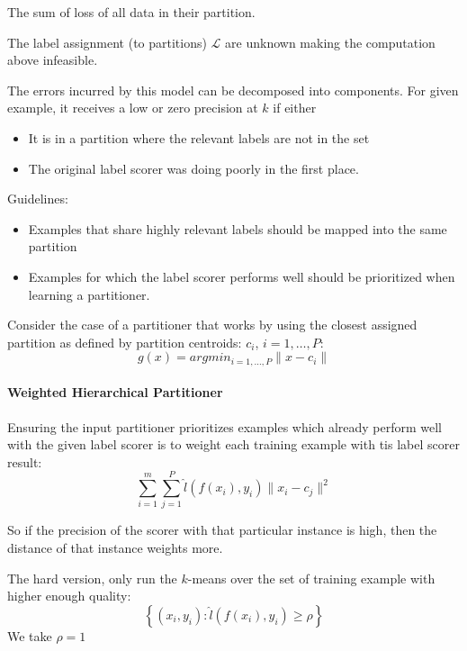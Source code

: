 The sum of loss of all data in their partition.

The label assignment (to partitions) $\mathcal{L}$ are unknown making the
computation above infeasible. 

The errors incurred by this model can be decomposed into components. For
given example, it receives a low or zero precision at $k$ if either

\begin{itemize}
    \item It is in a partition where the relevant labels are not in the
        set
    \item The original label scorer was doing poorly in the first place.
\end{itemize}

Guidelines:

\begin{itemize}
    \item Examples that share highly relevant labels should be mapped into
        the same partition
    \item Examples for which the label scorer performs well should be
        prioritized when learning a partitioner.
\end{itemize}

Consider the case of a partitioner that works by using the closest
assigned partition as defined by partition centroids:
$c_i$, $i = 1, \dots, P$:
\begin{equation}
    g(x) = argmin_{i=1,\dots, P}\|x - c_i\|
\end{equation}

\paragraph{Weighted Hierarchical Partitioner}
Ensuring the input partitioner prioritizes examples which already perform
well with the given label scorer is to weight each training example with
tis label scorer result:
\begin{equation}
    \sum_{i=1}^m\sum_{j=1}^P \hat{l}(f(x_i), y_i) \|x_i - c_j\|^2
\end{equation}

So if the precision of the scorer with that particular instance is high,
then the distance of that instance weights more.

The hard version, only run the $k$-means over the set of training example
with higher enough quality:
\[ \left\{ (x_i, y_i): \hat{l}(f(x_i), y_i) \geq \rho \right\} \]
We take $\rho = 1$

